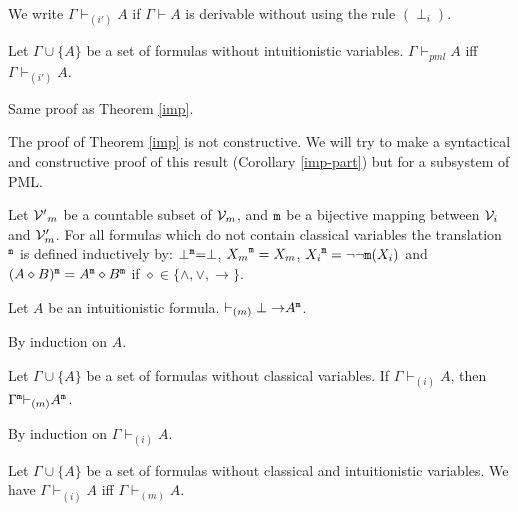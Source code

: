 \documentclass{jancl}
\begin{document}
\begin{definition}
We write ${\Gamma} {\vdash}_{(i')} A$ if ${\Gamma} {\vdash} A$ is derivable without using the rule
$(\perp_i)$.
\end{definition}

\begin{theorem} \label{imp'}
 Let ${\Gamma} \cup \{ A \}$ be a set of formulas without intuitionistic variables.
${\Gamma} {\vdash}_{pml} A$ iff ${\Gamma} {\vdash}_{(i')} A$.
\end{theorem}

\begin{proof*}
Same proof as Theorem \ref{imp}.
\end{proof*}

The proof of Theorem \ref{imp} is not constructive. We will try to make
a syntactical and constructive proof of this result (Corollary
\ref{imp-part}) but for a subsystem of PML.

\begin{definition}
Let ${\cal V'}_m$ be a countable subset of ${\cal V}_m$, and ${\tt m}$
be a bijective mapping between ${\cal V}_i$ and ${\cal V}'_m$. For all
formulas which do not contain classical variables the translation
$^{\tt m}$ is defined inductively by: $\perp^{\tt m} = \perp$,
${X_m}^{\tt m} = X_m$, ${X_i}^{\tt m} = \neg \neg {\tt m}(X_i)$ and
$(A \diamond B)^{\tt m} = A^{\tt m} \diamond B^{\tt m}$ if $\diamond
\in \{ {\wedge} , {\vee} , {\rightarrow} \}$.
\end{definition}

\begin{lemma}
Let $A$ be an intuitionistic formula.  ${\vdash}_{(m)} \perp {\rightarrow} A^{\tt m}$.
\end{lemma}

\begin{proof*}
By induction on $A$.
\end{proof*}

\begin{theorem}\label{tradm}
Let ${\Gamma} \cup \{ A \}$ be a set of formulas without classical variables.
If ${\Gamma} {\vdash}_{(i)} A$, then ${\Gamma}^{\tt m} {\vdash}_{(m)} A^{\tt m}$.
\end{theorem}

\begin{proof*}
By induction on ${\Gamma} {\vdash}_{(i)} A$.
\end{proof*}

\begin{corollary} \label{mincons}
Let ${\Gamma} \cup \{ A \}$ be a set of formulas without classical and
intuitionistic variables. We have ${\Gamma} {\vdash}_{(i)} A$ iff ${\Gamma} {\vdash}_{(m)}
A$.
\end{corollary}
\end{document}
